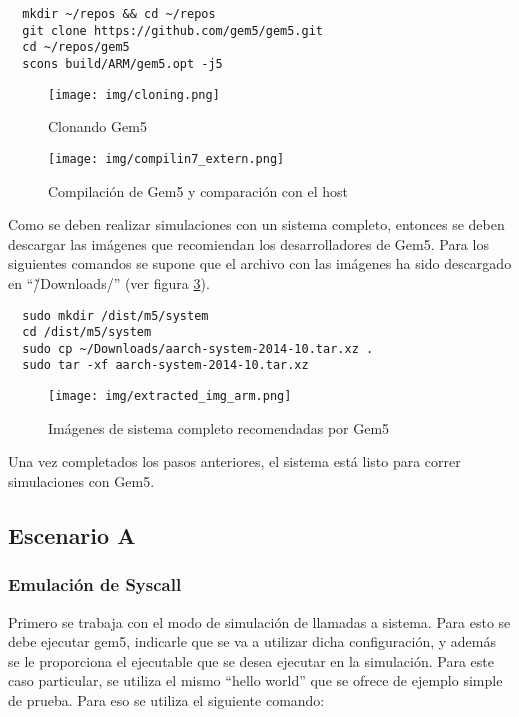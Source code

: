 \documentclass {article}
\begin{document}
\begin{lstlisting}
  mkdir ~/repos && cd ~/repos
  git clone https://github.com/gem5/gem5.git
  cd ~/repos/gem5
  scons build/ARM/gem5.opt -j5
\end{lstlisting}



\begin{figure}[H]
  \centering
  \texttt{[image: img/cloning.png]}
  \caption{\label{fig:cloning} Clonando Gem5}
\end{figure}

\begin{figure}[H]
  \centering
  \texttt{[image: img/compilin7\_extern.png]}
  \caption{\label{fig:compiling} Compilación de Gem5 y comparación con el host}
\end{figure}

Como se deben realizar simulaciones con un sistema completo, entonces se deben descargar las
imágenes que recomiendan los desarrolladores de Gem5. Para los siguientes comandos se supone que el
archivo con las imágenes ha sido descargado en ``\~/Downloads/'' (ver figura \ref{fig:extracted}). 

\begin{lstlisting}
  sudo mkdir /dist/m5/system
  cd /dist/m5/system
  sudo cp ~/Downloads/aarch-system-2014-10.tar.xz .
  sudo tar -xf aarch-system-2014-10.tar.xz
\end{lstlisting}

\begin{figure}[H]
  \centering
  \texttt{[image: img/extracted\_img\_arm.png]}
  \caption{\label{fig:extracted} Imágenes de sistema completo recomendadas por Gem5}
\end{figure}

Una vez completados los pasos anteriores, el sistema está listo para correr simulaciones con Gem5.

\subsection{Escenario A}

\subsubsection{Emulación de Syscall}
Primero se trabaja con el modo de simulación de llamadas a sistema. Para esto se debe ejecutar gem5,
indicarle que se va a utilizar dicha configuración, y además se le proporciona el ejecutable que se
desea ejecutar en la simulación. Para este caso particular, se utiliza el mismo ``hello world'' que se
ofrece de ejemplo simple de prueba. Para eso se utiliza el siguiente comando:
\end{document}

